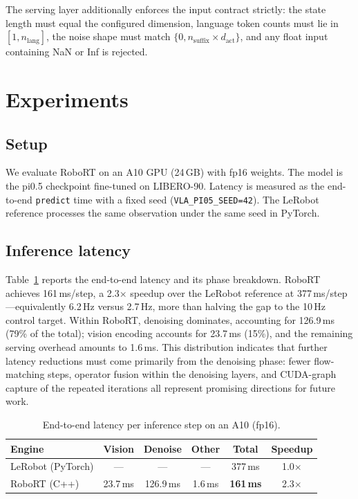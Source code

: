 \documentclass[11pt]{article}
\begin{document}
The serving layer additionally enforces the input contract strictly: the
state length must equal the configured dimension, language token counts must
lie in $[1, n_{\text{lang}}]$, the noise shape must match
$\{0, n_{\text{suffix}} \times d_{\text{act}}\}$, and any float input
containing NaN or Inf is rejected.

\section{Experiments}
\label{sec:experiments}

\subsection{Setup}
We evaluate RoboRT on an A10 GPU (24\,GB) with fp16 weights. The model is
the pi0.5 checkpoint fine-tuned on LIBERO-90. Latency is measured as the
end-to-end \texttt{predict} time with a fixed seed
(\texttt{VLA\_PI05\_SEED=42}). The LeRobot reference processes the same
observation under the same seed in PyTorch.

\subsection{Inference latency}
\label{sec:exp-latency}

Table~\ref{tab:latency} reports the end-to-end latency and its phase
breakdown. RoboRT achieves 161\,ms/step, a 2.3$\times$ speedup over the
LeRobot reference at 377\,ms/step---equivalently 6.2\,Hz versus 2.7\,Hz,
more than halving the gap to the 10\,Hz control target. Within RoboRT,
denoising dominates, accounting for 126.9\,ms (79\% of the total); vision
encoding accounts for 23.7\,ms (15\%), and the remaining serving overhead
amounts to 1.6\,ms. This distribution indicates that further latency
reductions must come primarily from the denoising phase: fewer
flow-matching steps, operator fusion within the denoising layers, and
CUDA-graph capture of the repeated iterations all represent promising
directions for future work.

\begin{table}[t]
  \centering
  \caption{End-to-end latency per inference step on an A10 (fp16).}
  \label{tab:latency}
  \begin{tabular}{lccccc}
    \toprule
    Engine & Vision & Denoise & Other & Total & Speedup \\
    \midrule
    LeRobot (PyTorch) & --- & --- & --- & 377\,ms & 1.0$\times$ \\
    RoboRT (C++)       & 23.7\,ms & 126.9\,ms & 1.6\,ms & \textbf{161\,ms} & 2.3$\times$ \\
    \bottomrule
  \end{tabular}
\end{table}
\end{document}
